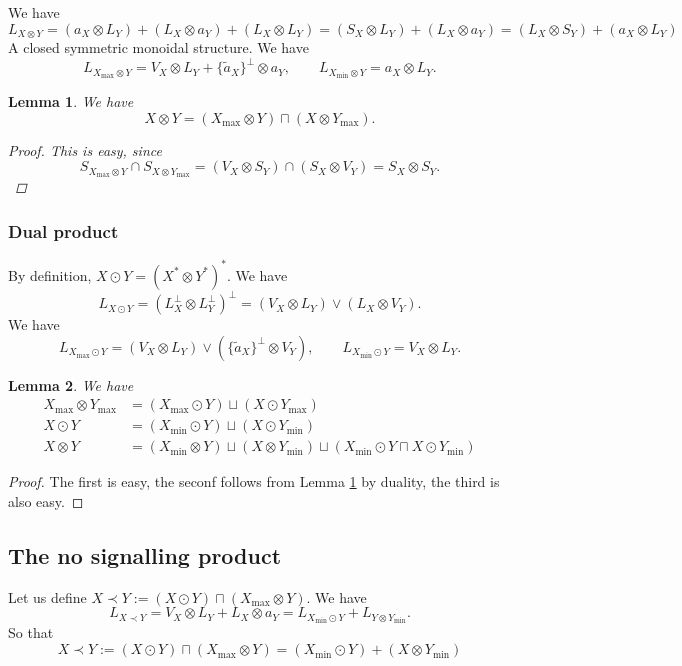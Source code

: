 \documentclass[12pt]{article}
\newtheorem{lemma}{Lemma}
\theoremstyle{definition}
\theoremstyle{remark}
\begin{document}
We have
\[
L_{X\otimes Y}=(a_X\otimes L_Y)+(L_X\otimes a_Y)+(L_X\otimes L_Y)=(S_X\otimes
L_Y)+(L_X\otimes a_Y)=(L_X\otimes S_Y)+(a_X\otimes L_Y)
\]
A closed symmetric monoidal structure. We have 
\[
L_{X_{\max} \otimes Y}=V_X\otimes L_Y+\{\tilde a_X\}^\perp\otimes a_Y,\qquad L_{X_{\min}\otimes Y}=a_X\otimes L_Y.
\]
\begin{lemma}\label{lemma:maxtensor}
We have
\[
X\otimes Y=(X_{\max}\otimes Y)\sqcap (X\otimes Y_{\max}). 
\]

\begin{proof} This is easy, since
\[
S_{X_{\max}\otimes Y}\cap S_{X\otimes Y_{\max}}=(V_X\otimes S_Y)\cap (S_X\otimes
V_Y)=S_X\otimes S_Y.
\]

\end{proof}

\end{lemma}

\subsubsection{Dual product}
By definition,  $X\odot Y=(X^*\otimes Y^*)^*$. We have
\[
L_{X\odot Y}=(L_X^\perp\otimes L_Y^\perp)^\perp=(V_X\otimes L_Y)\vee (L_X\otimes V_Y).
\]
We have
\[
L_{X_{\max}\odot Y}=(V_X\otimes L_Y)\vee(\{\tilde a_X\}^\perp\otimes V_Y),\qquad
L_{X_{\min}\odot Y}=V_X\otimes L_Y.
\]
\begin{lemma}\label{lemma:maxdual} We have
\begin{align*}
X_{\max}\otimes Y_{\max}&=(X_{\max}\odot Y)\sqcup (X\odot Y_{\max})\\
X\odot Y&=(X_{\min}\odot Y)\sqcup (X\odot Y_{\min})\\
X\otimes Y&= (X_{\min}\otimes Y)\sqcup (X\otimes Y_{\min})\sqcup (X_{\min}\odot Y \sqcap
X\odot Y_{\min}) 
\end{align*}


\end{lemma}

\begin{proof} The first is easy, the seconf follows from Lemma \ref{lemma:maxtensor} by
duality, the third is also easy.

\end{proof}

\subsection{The no signalling product}

Let us define $X\prec Y:= (X\odot Y)\sqcap (X_{\max}\otimes Y)$. We have
\[
L_{X\prec Y}=V_X\otimes L_Y+L_X\otimes a_Y=L_{X_{\min}\odot Y}+L_{Y\otimes Y_{\min}}.
\]
So that
\[
X\prec Y:= (X\odot Y)\sqcap (X_{\max}\otimes Y)=(X_{\min}\odot Y)+(X\otimes Y_{\min})
\]
\end{document}
